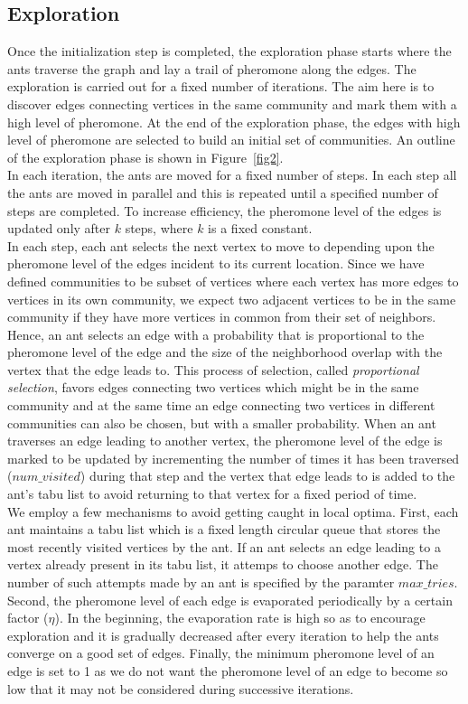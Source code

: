 \begin{spacing}{1.5}
\section{Exploration}
Once the initialization step is completed, the exploration phase starts where the ants traverse the graph and lay a trail of pheromone along the edges. The exploration is carried out for a fixed number of iterations. The aim here is to discover edges connecting vertices in the same community and mark them with a high level of pheromone. At the end of the exploration phase, the edges with high level of pheromone are selected to build an initial set of communities. An outline of the exploration phase is shown in Figure~\ref{fig2}.\\
\indent In each iteration, the ants are moved for a fixed number of steps. In each step all the ants are moved in parallel and this is repeated until a specified number of steps are completed.  To increase efficiency, the pheromone level of the edges is updated only after $k$ steps, where $k$ is a fixed constant.\\
\indent In each step, each ant selects the next vertex to move to depending upon the pheromone level of the edges incident to its current location. Since we have defined communities to be subset of vertices where each vertex has more edges to vertices in its own community, we expect two adjacent vertices to be in the same community if they have more vertices in common from their set of neighbors. Hence, an ant selects an edge with a probability that is proportional to the pheromone level of the edge and the size of the neighborhood overlap with the vertex that the edge leads to. This process of selection, called \emph{proportional selection}, favors edges connecting two vertices which might be in the same community and at the same time an edge connecting two vertices in different communities can also be chosen, but with a smaller probability. When an ant traverses an edge leading to another vertex, the pheromone level of the edge is marked to be updated by incrementing the number of times it has been traversed ($num\_visited$) during that step and the vertex that edge leads to is added to the ant's tabu list to avoid returning to that vertex for a fixed period of time.\\

\indent We employ a few mechanisms to avoid getting caught in local optima. First, each ant maintains a tabu list which is a fixed length circular queue that stores the most recently visited vertices by the ant. If an ant selects an edge leading to a vertex already present in its tabu list, it attemps to choose another edge. The number of such attempts made by an ant is specified by the paramter $max\_tries$. Second, the pheromone level of each edge is evaporated periodically by a certain factor ($\eta$). In the beginning, the evaporation rate is high so as to encourage exploration and it is gradually decreased after every iteration to help the ants converge on a good set of edges. Finally, the minimum pheromone level of an edge is set to 1 as we do not want the pheromone level of an edge to become so low that it may not be considered during successive iterations.\\

\end{spacing}
